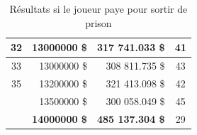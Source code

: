 \documentclass[letterpaper]{article}
\begin{document}
\begin{table}[h]
\begin{tabular}{|c|r|r|c|}
	  \cellcolor[HTML]{2E8B57} 32 & 13000000 \$ & 317 741.033 \$ & 41 \\ \hline
	  \cellcolor[HTML]{2E8B57} 33 & 13000000 \$ & 308 811.735 \$ & 43 \\ \hline
	  \cellcolor[HTML]{2E8B57} 35 & 13200000 \$ & 321 413.098 \$ & 42 \\ \hline
	  \cellcolor[HTML]{483D8B} \textcolor{white}{38} & 13500000 \$ & 300 058.049 \$ & 45 \\ \hline
	  \cellcolor[HTML]{483D8B} \textcolor{white}{40} & \textbf{14000000 \$} & \textbf{485 137.304 \$} & 29 \\ \hline
	\end{tabular}
	\caption{Résultats si le joueur paye pour sortir de prison}
	\label{table:result_tour_paye}
      \end{table}
	
\end{document}
